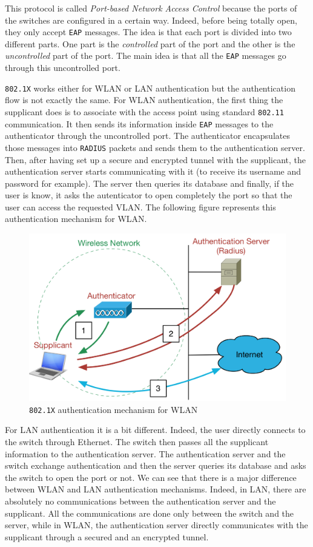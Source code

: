 This protocol is called \textit{Port-based Network Access Control} because the ports of the switches are configured in a certain way. Indeed, before being totally open, they only accept \texttt{EAP} messages. The idea is that each port is divided into two different parts. One part is the \textit{controlled} part of the port and the other is the \textit{uncontrolled} part of the port. The main idea is that all the \texttt{EAP} messages go through this uncontrolled port.

\texttt{802.1X} works either for WLAN or LAN authentication but the authentication flow is not exactly the same.
For WLAN authentication, the first thing the supplicant does is to associate with the access point using standard \texttt{802.11} communication. It then sends its information inside \texttt{EAP} messages to the authenticator through the uncontrolled port. The authenticator encapsulates those messages into \texttt{RADIUS} packets and sends them to the authentication server. Then, after having set up a secure and encrypted tunnel with the supplicant, the authentication server starts communicating with it (to receive its username and password for example). The server then queries its database and finally, if the user is know, it asks the autenticator to open completely the port so that the user can access the requested VLAN.
The following figure represents this authentication mechanism for WLAN.

\begin{figure}[H]
	\includegraphics[width=.7\linewidth]{Pictures/Chapter3/802.png}
	\caption{\texttt{802.1X} authentication mechanism for WLAN}
\end{figure}

For LAN authentication it is a bit different. Indeed, the user directly connects to the switch through Ethernet. The switch then passes all the supplicant information to the authentication server. The authentication server and the switch exchange authentication and then the server queries its database and asks the switch to open the port or not.
We can see that there is a major difference between WLAN and LAN authentication mechanisms. Indeed, in LAN, there are absolutely no communications between the authentication server and the supplicant. All the communications are done only between the switch and the server, while in WLAN, the authentication server directly communicates with the supplicant through a secured and an encrypted tunnel. 



